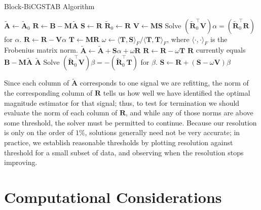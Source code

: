 \begin{algorithm}
\caption{Block-BiCGSTAB Algorithm}
\label{alg:BlBiCGSTAB}
\begin{algorithmic}[1]
\STATE $\mathbf{\widetilde{A}} \gets \mathbf{\widetilde{A}}_0$
\STATE $\mathbf{R} \gets \mathbf{B}-\mathbf{M\widetilde{A}}$ \label{algline:MatrixMul1}
\STATE $\mathbf{S} \gets \mathbf{R}$
\STATE $\mathbf{\widetilde{R}}_0 \gets \mathbf{R}$
\LOOP
  \STATE $\mathbf{V} \gets \mathbf{M}\mathbf{S}$ \label{algline:MatrixMul2}
  \STATE Solve $(\mathbf{\widetilde{R}}_0^\top \mathbf{V})\alpha = (\mathbf{\widetilde{R}}_0^\top \mathbf{R})$ for $\alpha$. \label{algline:BlBiCGSTAB_alpha}
  \STATE $\mathbf{R} \gets \mathbf{R} - \mathbf{V}\alpha$
  \STATE $\mathbf{T} \gets \mathbf{M}\mathbf{R}$ \label{algline:MatrixMul3}
  \STATE $\omega \gets {\langle \mathbf{T},\mathbf{S}\rangle_F} / {\langle \mathbf{T},\mathbf{T}\rangle_F} $, where $\langle\cdot,\cdot\rangle_F$ is the Frobenius matrix norm.
  \STATE $\mathbf{\widetilde{A}} \gets \mathbf{\widetilde{A}} + \mathbf{S}\alpha + \omega \mathbf{R}$
  \STATE $\mathbf{R} \gets \mathbf{R} - \omega \mathbf{T}$
  \STATE $\mathbf{R}$ currently equals $\mathbf{B}-\mathbf{M\widetilde{A}}$
    \RETURN $\mathbf{\widetilde{A}}$
  \ENDIF
  \STATE Solve $(\mathbf{\widetilde{R}}_0^\top \mathbf{V})\beta = -(\mathbf{\widetilde{R}}_0^\top \mathbf{T})$ for $\beta$. \label{algline:BlBiCGSTAB_beta}
  \STATE $\mathbf{S} \gets \mathbf{R} + (\mathbf{S} - \omega \mathbf{V}) \beta$
\ENDLOOP
\end{algorithmic}
\end{algorithm}

Since each column of $\mathbf{\widetilde{A}}$ corresponds to one signal we are refitting, the norm of the corresponding column of $\mathbf{R}$ tells us how well we have identified the optimal magnitude estimator for that signal; thus, to test for termination we should evaluate the norm of each column of $\mathbf{R}$, and while any of those norms are above some threshold, the solver must be permitted to continue.  Because our resolution is only on the order of $1\%$, solutions generally need not be very accurate; in practice, we establish reasonable thresholds by plotting resolution against threshold for a small subset of data, and observing when the resolution stops improving.

\section{Computational Considerations}\label{sec:DenoisingComputationalConsiderations}

